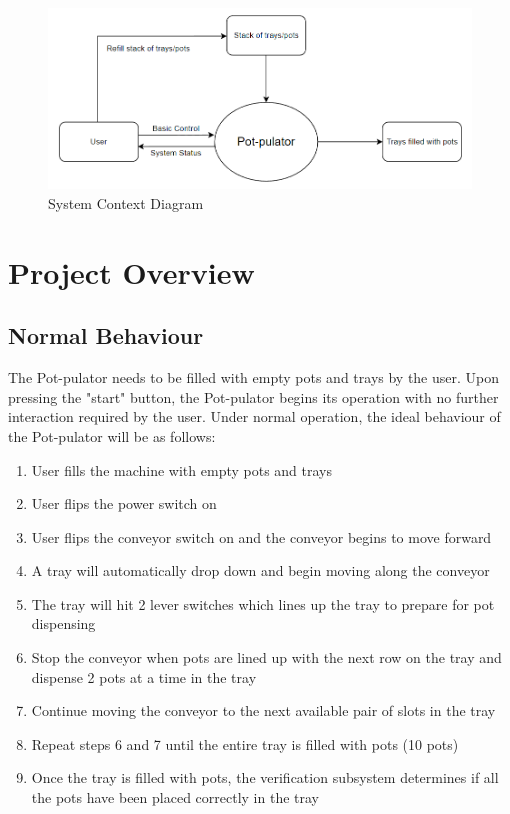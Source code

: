 \documentclass[12pt, titlepage]{article}
\begin{document}
\begin{figure}[H]
  \includegraphics[width=\linewidth]{scope.PNG}
  \caption{System Context Diagram}
  \label{fig:scope}
\end{figure}

\section{Project Overview}

\subsection{Normal Behaviour}

The Pot-pulator needs to be filled with empty pots and trays by the user. Upon pressing the "start" button,
the Pot-pulator begins its operation with no further interaction required by the user.
Under normal operation, the ideal behaviour of the Pot-pulator will be as follows:
\begin{enumerate}
  \item User fills the machine with empty pots and trays
  \item User flips the power switch on
  \item User flips the conveyor switch on and the conveyor begins to move forward
  \item A tray will automatically drop down and begin moving along the conveyor
  \item The tray will hit 2 lever switches which lines up the tray to prepare for pot dispensing
  \item Stop the conveyor when pots are lined up with the next row on the tray and dispense 2 pots at a time in the tray
  \item Continue moving the conveyor to the next available pair of slots in the tray
  \item Repeat steps 6 and 7 until the entire tray is filled with pots (10 pots)
  \item Once the tray is filled with pots, the verification subsystem determines if all the pots have been placed correctly in the tray
\end{enumerate}
\end{document}
